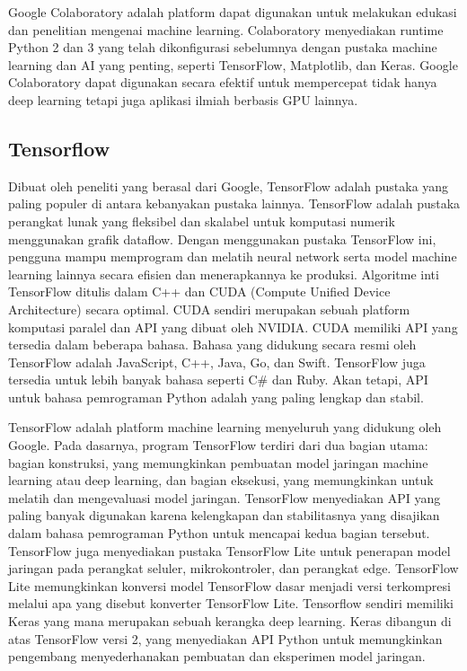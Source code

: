 Google Colaboratory adalah platform dapat digunakan untuk melakukan edukasi dan penelitian mengenai machine learning. Colaboratory menyediakan runtime Python 2 dan 3 yang telah dikonfigurasi sebelumnya dengan pustaka machine learning dan AI yang penting, seperti TensorFlow, Matplotlib, dan Keras. Google Colaboratory dapat digunakan secara efektif untuk mempercepat tidak hanya deep learning tetapi juga aplikasi ilmiah berbasis GPU lainnya\parencite{Carneiro2018}.

\subsection{Tensorflow}
Dibuat oleh peneliti yang berasal dari Google, TensorFlow adalah pustaka yang paling populer di antara kebanyakan pustaka lainnya. TensorFlow adalah pustaka perangkat lunak yang fleksibel dan skalabel untuk komputasi numerik menggunakan grafik dataflow. Dengan menggunakan pustaka TensorFlow ini, pengguna mampu memprogram dan melatih neural network serta model machine learning lainnya secara efisien dan menerapkannya ke produksi. Algoritme inti TensorFlow ditulis dalam C++ dan CUDA (Compute Unified Device Architecture) secara optimal. CUDA sendiri merupakan sebuah platform komputasi paralel dan API yang dibuat oleh NVIDIA. CUDA memiliki API yang tersedia dalam beberapa bahasa. Bahasa yang didukung secara resmi oleh TensorFlow adalah JavaScript, C++, Java, Go, dan Swift. TensorFlow juga tersedia untuk lebih banyak bahasa seperti C\# dan Ruby. Akan tetapi, API untuk bahasa pemrograman Python adalah yang paling lengkap dan stabil\parencite{Pang2019}.

TensorFlow adalah platform machine learning menyeluruh yang didukung oleh Google. Pada dasarnya, program TensorFlow terdiri dari dua bagian utama: bagian konstruksi, yang memungkinkan pembuatan model jaringan machine learning atau deep learning, dan bagian eksekusi, yang memungkinkan untuk melatih dan mengevaluasi model jaringan. TensorFlow menyediakan API yang paling banyak digunakan karena kelengkapan dan stabilitasnya yang disajikan dalam bahasa pemrograman Python untuk mencapai kedua bagian tersebut. TensorFlow juga menyediakan pustaka TensorFlow Lite untuk penerapan model jaringan pada perangkat seluler, mikrokontroler, dan perangkat edge. TensorFlow Lite memungkinkan konversi model TensorFlow dasar menjadi versi terkompresi melalui apa yang disebut konverter TensorFlow Lite. Tensorflow sendiri memiliki Keras yang mana merupakan sebuah kerangka deep learning. Keras dibangun di atas TensorFlow versi 2, yang menyediakan API Python untuk memungkinkan pengembang menyederhanakan pembuatan dan eksperimen model jaringan\parencite{Contoli2023}.

